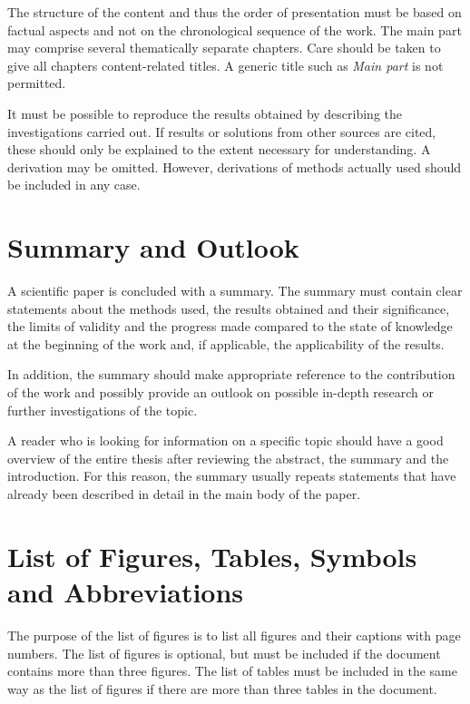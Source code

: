 The structure of the content and thus the order of presentation must be based on factual aspects and not on the chronological sequence of the work. The main part may comprise several thematically separate chapters. Care should be taken to give all chapters content-related titles. A generic title such as \textit{Main part} is not permitted.

It must be possible to reproduce the results obtained by describing the investigations carried out. If results or solutions from other sources are cited, these should only be explained to the extent necessary for understanding. A derivation may be omitted. However, derivations of methods actually used should be included in any case.



\section{Summary and Outlook}
\label{sec:Summary}

A scientific paper is concluded with a summary. The summary must contain clear statements about the methods used, the results obtained and their significance, the limits of validity and the progress made compared to the state of knowledge at the beginning of the work and, if applicable, the applicability of the results. 

In addition, the summary should make appropriate reference to the contribution of the work and possibly provide an outlook on possible in-depth research or further investigations of the topic.

A reader who is looking for information on a specific topic should have a good overview of the entire thesis after reviewing the abstract, the summary and the introduction. For this reason, the summary usually repeats statements that have already been described in detail in the main body of the paper.



\section{List of Figures, Tables, Symbols and Abbreviations}
\label{sec:Fig-Tab-Symb-Abk-v}

The purpose of the list of figures is to list all figures and their captions with page numbers. The list of figures is optional, but must be included if the document contains more than three figures. The list of tables must be included in the same way as the list of figures if there are more than three tables in the document.

